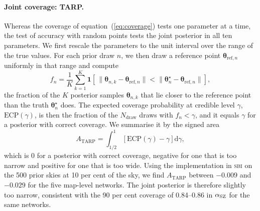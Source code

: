 \paragraph*{Joint coverage: TARP.} Whereas the coverage of equation~(\ref{eq:coverage}) tests one parameter
at a time, the test of accuracy with random points \citep[TARP;][]{Lemos2023} tests the joint posterior in
all ten parameters. We first rescale the parameters to the unit interval over the range of the true values. For each prior draw $n$, we then draw a reference point $\bm\theta_{\mathrm{ref},n}$ uniformly in
that range and compute
\begin{equation}
f_n = \frac{1}{K}\sum_{k=1}^{K}\mathbf 1\!\left[\,\lVert\bm\theta_{n,k}-\bm\theta_{\mathrm{ref},n}\rVert
<\lVert\bm\theta^\star_n-\bm\theta_{\mathrm{ref},n}\rVert\right],
\label{eq:tarp_f}
\end{equation}
the fraction of the $K$ posterior samples $\bm\theta_{n,k}$ that lie closer to the reference point than the
truth $\bm\theta^\star_n$ does. The expected coverage probability at credible level $\gamma$,
$\mathrm{ECP}(\gamma)$, is then the fraction of the $N_\mathrm{draw}$ draws with $f_n<\gamma$, and it
equals $\gamma$ for a posterior with correct coverage. We summarise it by the signed area
\begin{equation}
A_\mathrm{TARP} = \int_{1/2}^{1}\left[\mathrm{ECP}(\gamma)-\gamma\right]\mathrm{d}\gamma,
\label{eq:tarp_a}
\end{equation}
which is 0 for a posterior with correct coverage, negative for one that is too narrow and positive for one
that is too wide. Using the implementation in \textsc{sbi} on the 500 prior skies at 10 per cent of the
sky, we find $A_\mathrm{TARP}$ between $-0.009$ and $-0.029$ for the five map-level networks. The joint
posterior is therefore slightly too narrow, consistent with the 90 per cent coverage of 0.84--0.86 in
$\alpha_\mathrm{SZ}$ for the same networks.
